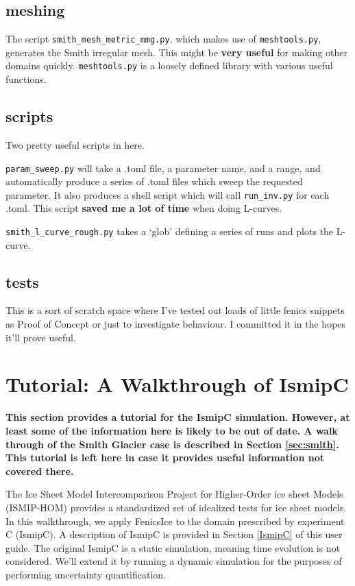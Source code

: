\documentclass[11pt, reqno, nocenter]{article}
\begin{document}
\subsection{meshing}

The script {\tt smith\_mesh\_metric\_mmg.py}, which makes use of {\tt meshtools.py}, generates the Smith irregular mesh. This might be \textbf{very useful} for making other domains quickly. {\tt meshtools.py} is a loosely defined library with various useful functions.

\subsection{scripts} \label{sec:scripts}

Two pretty useful scripts in here.

{\tt param\_sweep.py} will take a .toml file, a parameter name, and a range, and automatically produce a series of .toml files which sweep the requested parameter. It also produces a shell script which will call {\tt run\_inv.py} for each .toml. This script \textbf{saved me a lot of time} when doing L-curves.

{\tt smith\_l\_curve\_rough.py} takes a `glob' defining a series of runs and plots the L-curve.

\subsection{tests}

This is a sort of scratch space where I've tested out loads of little fenics snippets as Proof of Concept or just to investigate behaviour. I committed it in the hopes it'll prove useful.

\section{Tutorial: A Walkthrough of IsmipC}

\textbf{This section provides a tutorial for the IsmipC simulation. However, at least some of the information here is likely to be out of date. A walk through of the Smith Glacier case is described in Section \ref{sec:smith}. This tutorial is left here in case it provides useful information not covered there.}

The Ice Sheet Model Intercomparison Project for Higher-Order ice sheet Models (ISMIP-HOM) provides a standardized set of idealized tests for ice sheet models. In this walkthrough, we apply FenicsIce to the domain prescribed by experiment C (IsmipC). A description of IsmipC is provided in Section \ref{IsmipC} of this user guide. The original IsmipC is a static simulation, meaning time evolution is not considered. We'll extend it by running a dynamic simulation for the purposes of performing uncertainty quantification.
\end{document}
